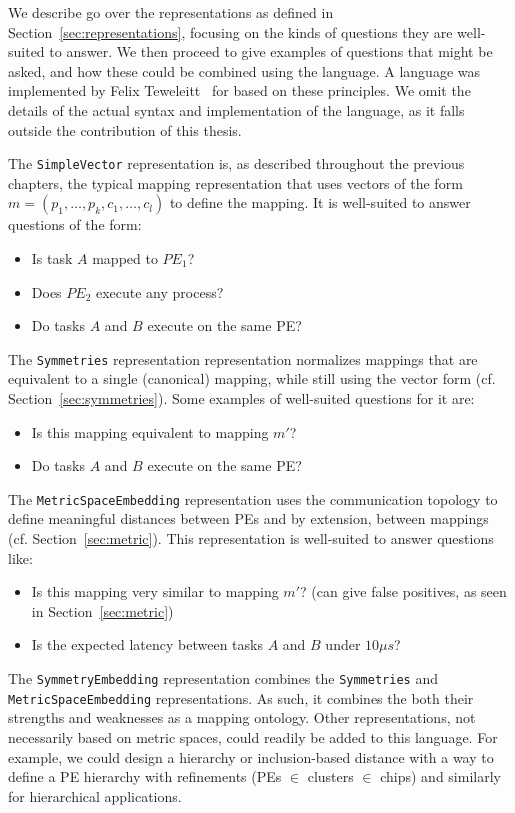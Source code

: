 We describe go over the representations as defined in Section~\ref{sec:representations}, focusing on the kinds of questions they are well-suited to answer.
We then proceed to give examples of questions that might be asked, and how these could be combined using the language.
A language was implemented by Felix Teweleitt~\cite{teweleitt_studienarbeit} for \mocasin based on these principles.
We omit the details of the actual syntax and implementation of the language, as it falls outside the contribution of this thesis.

The \texttt{SimpleVector} representation is, as described throughout the previous chapters, the typical mapping representation that uses vectors of the form $ m = (p_1,\ldots,p_k,c_1,\ldots,c_l)$ to define the mapping.
It is well-suited to answer questions of the form:
\begin{itemize}
  \item Is task $A$ mapped to $PE_1$?
  \item Does $PE_2$ execute any process?
 \item Do tasks $A$ and $B$ execute on the same \ac{PE}?
\end{itemize}

The \texttt{Symmetries} representation representation normalizes mappings that are equivalent to a single (canonical) mapping, while still using the vector form (cf. Section~\ref{sec:symmetries}).
Some examples of well-suited questions for it are:

\begin{itemize}
\item Is this mapping equivalent to mapping $m'$?
\item Do tasks $A$ and $B$ execute on the same \ac{PE}?
\end{itemize}

The \texttt{MetricSpaceEmbedding} representation uses the communication topology to define meaningful distances between \acp{PE} and by extension, between mappings (cf. Section~\ref{sec:metric}).
This representation is well-suited to answer questions like:
\begin{itemize}
\item Is this mapping very similar to mapping $m'$? (can give false positives, as seen in Section~\ref{sec:metric})
\item Is the expected latency between tasks $A$ and $B$ under $10 \mu s$?
\end{itemize}

The \texttt{SymmetryEmbedding} representation combines the \texttt{Symmetries} and \texttt{MetricSpaceEmbedding} representations. As such, it combines the both their strengths and weaknesses as a mapping ontology.
Other representations, not necessarily based on metric spaces, could readily be added to this language. 
For example, we could design a hierarchy or inclusion-based distance with a way to define a \ac{PE} hierarchy with refinements (PEs $\in$ clusters $\in$ chips) and similarly for hierarchical applications.

